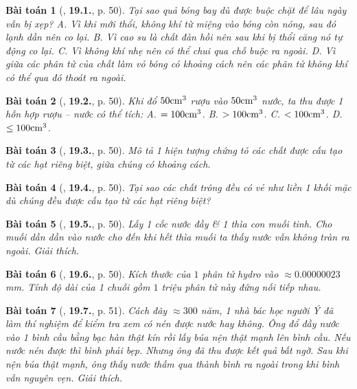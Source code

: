 \documentclass{article}
\numberwithin{equation}{section}
\newtheorem{baitoan}{Bài toán}
\begin{document}
\begin{baitoan}[\cite{SBT_Vat_Ly_8}, \textbf{19.1.}, p. 50]
	Tại sao quả bóng bay dù được buộc chặt để lâu ngày vẫn bị xẹp? {\sf A.} Vì khi mới thổi, không khí từ miệng vào bóng còn nóng, sau đó lạnh dần nên co lại. {\sf B.} Vì cao su là chất đàn hồi nên sau khi bị thổi căng nó tự động co lại. {\sf C.} Vì không khí nhẹ nên có thể chui qua chỗ buộc ra ngoài. {\sf D.} Vì giữa các phân tử của chất làm vỏ bóng có khoảng cách nên các phân tử không khí có thể qua đó thoát ra ngoài.
\end{baitoan}

\begin{baitoan}[\cite{SBT_Vat_Ly_8}, \textbf{19.2.}, p. 50]
	Khi đổ $50{\rm cm}^3$ rượu vào $50{\rm cm}^3$ nước, ta thu được 1 hỗn hợp rượu -- nước có thể tích: {\sf A.} $= 100{\rm cm}^3$. {\sf B.} $> 100{\rm cm}^3$. {\sf C.} $< 100{\rm cm}^3$. {\sf D.} $\le100{\rm cm}^3$.
\end{baitoan}

\begin{baitoan}[\cite{SBT_Vat_Ly_8}, \textbf{19.3.}, p. 50]
	Mô tả 1 hiện tượng chứng tỏ các chất được cấu tạo từ các hạt riêng biệt, giữa chúng có khoảng cách.
\end{baitoan}

\begin{baitoan}[\cite{SBT_Vat_Ly_8}, \textbf{19.4.}, p. 50]
	Tại sao các chất trông đều có vẻ như liền 1 khối mặc dù chúng đều được cấu tạo từ các hạt riêng biệt?
\end{baitoan}

\begin{baitoan}[\cite{SBT_Vat_Ly_8}, \textbf{19.5.}, p. 50]
	Lấy 1 cốc nước đầy \& 1 thìa con muối tinh. Cho muối dần dần vào nước cho đến khi hết thìa muối ta thấy nước vẫn không tràn ra ngoài. Giải thích.
\end{baitoan}

\begin{baitoan}[\cite{SBT_Vat_Ly_8}, \textbf{19.6.}, p. 50]
	Kích thước của $1$ phân tử hydro vào $\approx0.00000023$\emph{mm}. Tính độ dài của 1 chuỗi gồm $1$ triệu phân tử này đứng nối tiếp nhau.
\end{baitoan}

\begin{baitoan}[\cite{SBT_Vat_Ly_8}, \textbf{19.7.}, p. 51]
	Cách đây $\approx300$ năm, 1 nhà bác học người Ý đã làm thí nghiệm để kiểm tra xem có nén được nước hay không. Ông đổ đầy nước vào 1 bình cầu bằng bạc hàn thật kín rồi lấy búa nện thật mạnh lên bình cầu. Nếu nước nén được thì bình phải bẹp. Nhưng ông đã thu được kết quả bất ngờ. Sau khi nện búa thật mạnh, ông thấy nước thấm qua thành bình ra ngoài trong khi bình vẫn nguyên vẹn. Giải thích.
\end{baitoan}
\end{document}
